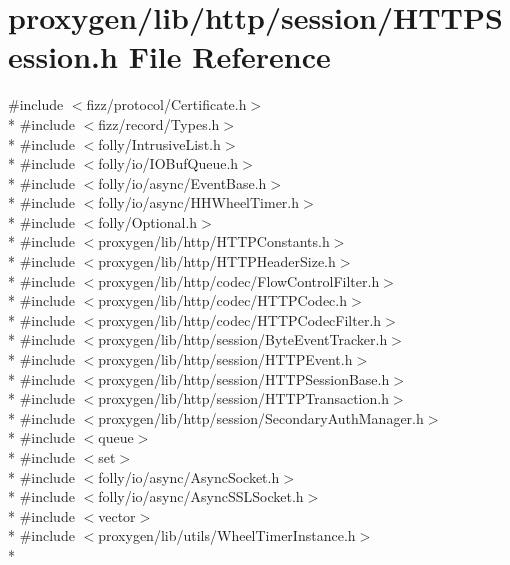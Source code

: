 \section{proxygen/lib/http/session/\+H\+T\+T\+P\+Session.h File Reference}
\label{HTTPSession_8h}
{\ttfamily \#include $<$fizz/protocol/\+Certificate.\+h$>$}\\*
{\ttfamily \#include $<$fizz/record/\+Types.\+h$>$}\\*
{\ttfamily \#include $<$folly/\+Intrusive\+List.\+h$>$}\\*
{\ttfamily \#include $<$folly/io/\+I\+O\+Buf\+Queue.\+h$>$}\\*
{\ttfamily \#include $<$folly/io/async/\+Event\+Base.\+h$>$}\\*
{\ttfamily \#include $<$folly/io/async/\+H\+H\+Wheel\+Timer.\+h$>$}\\*
{\ttfamily \#include $<$folly/\+Optional.\+h$>$}\\*
{\ttfamily \#include $<$proxygen/lib/http/\+H\+T\+T\+P\+Constants.\+h$>$}\\*
{\ttfamily \#include $<$proxygen/lib/http/\+H\+T\+T\+P\+Header\+Size.\+h$>$}\\*
{\ttfamily \#include $<$proxygen/lib/http/codec/\+Flow\+Control\+Filter.\+h$>$}\\*
{\ttfamily \#include $<$proxygen/lib/http/codec/\+H\+T\+T\+P\+Codec.\+h$>$}\\*
{\ttfamily \#include $<$proxygen/lib/http/codec/\+H\+T\+T\+P\+Codec\+Filter.\+h$>$}\\*
{\ttfamily \#include $<$proxygen/lib/http/session/\+Byte\+Event\+Tracker.\+h$>$}\\*
{\ttfamily \#include $<$proxygen/lib/http/session/\+H\+T\+T\+P\+Event.\+h$>$}\\*
{\ttfamily \#include $<$proxygen/lib/http/session/\+H\+T\+T\+P\+Session\+Base.\+h$>$}\\*
{\ttfamily \#include $<$proxygen/lib/http/session/\+H\+T\+T\+P\+Transaction.\+h$>$}\\*
{\ttfamily \#include $<$proxygen/lib/http/session/\+Secondary\+Auth\+Manager.\+h$>$}\\*
{\ttfamily \#include $<$queue$>$}\\*
{\ttfamily \#include $<$set$>$}\\*
{\ttfamily \#include $<$folly/io/async/\+Async\+Socket.\+h$>$}\\*
{\ttfamily \#include $<$folly/io/async/\+Async\+S\+S\+L\+Socket.\+h$>$}\\*
{\ttfamily \#include $<$vector$>$}\\*
{\ttfamily \#include $<$proxygen/lib/utils/\+Wheel\+Timer\+Instance.\+h$>$}\\*
